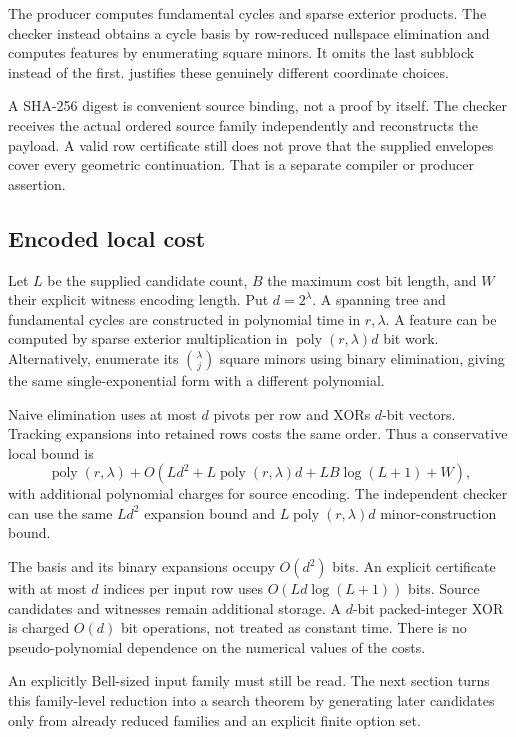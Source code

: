 \documentclass[11pt,a4paper]{article}
\theoremstyle{definition}
\theoremstyle{remark}
\newcommand{\poly}{\operatorname{poly}}
\begin{document}
The producer computes fundamental cycles and sparse exterior products. The checker
instead obtains a cycle basis by row-reduced nullspace elimination and computes features
by enumerating square minors. It omits the last subblock instead of the first.
 justifies these genuinely different coordinate choices.

A SHA-256 digest is convenient source binding, not a proof by itself. The checker receives
the actual ordered source family independently and reconstructs the payload. A valid row
certificate still does not prove that the supplied envelopes cover every geometric
continuation. That is a separate compiler or producer assertion.

\subsection{Encoded local cost}\label{sub:localcost}
Let $L$ be the supplied candidate count, $B$ the maximum cost bit length, and $W$ their
explicit witness encoding length. Put $d=2^\lambda$. A spanning tree and fundamental
cycles are constructed in polynomial time in $r,\lambda$. A feature can be computed by
sparse exterior multiplication in $\poly(r,\lambda)d$ bit work. Alternatively, enumerate
its $\binom\lambda j$ square minors using binary elimination, giving the same
single-exponential form with a different polynomial.

Naive elimination uses at most $d$ pivots per row and XORs $d$-bit vectors. Tracking
expansions into retained rows costs the same order. Thus a conservative local bound is
\begin{equation}
 \poly(r,\lambda)+O\!\left(Ld^2+L\poly(r,\lambda)d
                    +LB\log(L+1)+W\right),
 \label{eq:localcost}
\end{equation}
with additional polynomial charges for source encoding. The independent checker can
use the same $Ld^2$ expansion bound and $L\poly(r,\lambda)d$ minor-construction bound.

The basis and its binary expansions occupy $O(d^2)$ bits. An explicit certificate with
at most $d$ indices per input row uses $O(Ld\log(L+1))$ bits. Source candidates and
witnesses remain additional storage. A $d$-bit packed-integer XOR is charged $O(d)$ bit
operations, not treated as constant time. There is no pseudo-polynomial dependence on
the numerical values of the costs.

An explicitly Bell-sized input family must still be read. The next section turns this
family-level reduction into a search theorem by generating later candidates only from
already reduced families and an explicit finite option set.
\end{document}
